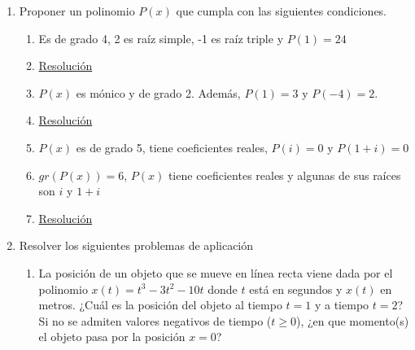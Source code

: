 \documentclass[a4paper]{article}
\newcommand{\answer}{\item[**]}
\newcommand{\exercise}{\item}
\begin{document}
\begin{enumerate}
\begin{multicols}{2}
\begin{enumerate} [label=(\alph*)]
		\item $x^3-x=10$
		\answer Es equivalente a $x^3-x-10=0$. Por el teorema de la raíz real para polinomios de grado impar sabemos que debe tener una raíz real. La aproximamos por Bolzano: $x_1 \simeq 2.3089$. Lo unico que podemos saber de las otras raíces sin efectuar la división es que son reales o bien complejas conjugadas.

		\item $x^5-8=3x$
		\answer Es equivalente a $x^5-3x-8=0$. Por el teorema de la raíz real para polinomios de grado impar sabemos que debe tener una raíz real. La aproximamos por Bolzano: $x_1 \simeq 1.6706$. 

	\end{enumerate}
	\end{multicols}


	\exercise Proponer un polinomio $P(x)$ que cumpla con las siguientes condiciones.
	\begin{enumerate} [label=(\alph*)]
		
		\item Es de grado 4, 2 es raíz simple, -1 es raíz triple y $P(1)=24$
		\answer \href{https://youtu.be/_XVYatmUKBg}{Resolución}

		\item $P(x)$ es mónico y de grado 2. Además, $P(1)=3$ y $P(-4)=2$.
		\answer \href{https://youtu.be/LDpq_f-baPc}{Resolución}

		\item $P(x)$ es de grado 5, tiene coeficientes reales, $P(i)=0$ y $P(1+i)=0$

		\item $gr\left(P(x)\right)=6$, $P(x)$ tiene coeficientes reales y algunas de sus raíces son $i$ y $1+i$
		\answer \href{https://youtu.be/LDpq_f-baPc}{Resolución}

	\end{enumerate}


	\exercise Resolver los siguientes problemas de aplicación
	\begin{enumerate} [label=(\alph*)]
		
		\item La posición de un objeto que se mueve en línea recta viene dada por el polinomio $x(t) = t^3 - 3t^2 -10t$ donde $t$ está en segundos y $x(t)$ en metros. ¿Cuál es la posición del objeto al tiempo $t=1$ y a tiempo $t=2$? Si no se admiten valores negativos de tiempo ($t \geq 0$), ¿en que momento(s) el objeto pasa por la posición $x=0$?


\end{enumerate}
\end{enumerate}
\end{document}

